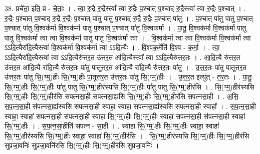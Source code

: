\documentclass[17pt]{extarticle}
\begin{document}
38. प्रचे॑ता॒ इति॒ प्र - चे॒ताः॒ । . त्वा॒ रु॒द्रै रु॒द्रैस्त्वा᳚ त्वा रु॒द्रैः प॒श्चात् प॒श्चाद् रु॒द्रैस्त्वा᳚ त्वा रु॒द्रैः प॒श्चात् । . रु॒द्रैः प॒श्चात् प॒श्चाद् रु॒द्रै रु॒द्रैः प॒श्चात् पा॑तु पातु प॒श्चाद् रु॒द्रै रु॒द्रैः प॒श्चात् पा॑तु । . प॒श्चात् पा॑तु पातु प॒श्चात् प॒श्चात् पा॑तु वि॒श्वक॑र्मा वि॒श्वक॑र्मा पातु प॒श्चात् प॒श्चात् पा॑तु वि॒श्वक॑र्मा । . पा॒तु॒ वि॒श्वक॑र्मा वि॒श्वक॑र्मा पातु पातु वि॒श्वक॑र्मा त्वा त्वा वि॒श्वक॑र्मा पातु पातु वि॒श्वक॑र्मा त्वा । . वि॒श्वक॑र्मा त्वा त्वा वि॒श्वक॑र्मा वि॒श्वक॑र्मा त्वा ऽऽदि॒त्यैरा॑दि॒त्यैस्त्वा॑ वि॒श्वक॑र्मा वि॒श्वक॑र्मा त्वा ऽऽदि॒त्यैः । . वि॒श्वक॒र्मेति॑ वि॒श्व - क॒र्मा॒ । . त्वा॒ ऽऽदि॒त्यैरा॑दि॒त्यैस्त्वा᳚ त्वा ऽऽदि॒त्यैरु॑त्तर॒त उ॑त्तर॒त आ॑दि॒त्यैस्त्वा᳚ त्वा ऽऽदि॒त्यैरु॑त्तर॒तः । . आ॒दि॒त्यै रु॑त्तर॒त उ॑त्तर॒त आ॑दि॒त्यै रा॑दि॒त्यै रु॑त्तर॒तः पा॑तु पातूत्तर॒त आ॑दि॒त्यै रा॑दि॒त्यै रु॑त्तर॒तः पा॑तु । . उ॒त्त॒र॒तः पा॑तु पातूत्तर॒त उ॑त्तर॒तः पा॑तु सि॒(ग्म्॒)हीः सि॒(ग्म्॒)हीः पा॒तूत्तर॒त उ॑त्तर॒तः पा॑तु सि॒(ग्म्॒)हीः । . उ॒त्त॒र॒त इत्यु॑त् - त॒र॒तः । . पा॒तु॒ सि॒(ग्म्॒)हीः सि॒(ग्म्॒)हीः पा॑तु पातु सि॒(ग्म्॒)हीर॑स्यसि सि॒(ग्म्॒)हीः पा॑तु पातु सि॒(ग्म्॒)हीर॑सि । . सि॒(ग्म्॒)हीर॑स्यसि सि॒(ग्म्॒)हीः सि॒(ग्म्॒)हीर॑सि सपत्नसा॒ही स॑पत्नसा॒ह्य॑सि सि॒(ग्म्॒)हीः सि॒(ग्म्॒)हीर॑सि सपत्नसा॒ही । . अ॒सि॒ स॒प॒त्न॒सा॒ही स॑पत्नसा॒ह्य॑स्यसि सपत्नसा॒ही स्वाहा॒ स्वाहा॑ सपत्नसा॒ह्य॑स्यसि सपत्नसा॒ही स्वाहा᳚ । . स॒प॒त्न॒सा॒ही स्वाहा॒ स्वाहा॑ सपत्नसा॒ही स॑पत्नसा॒ही स्वाहा॑ सि॒(ग्म्॒)हीः सि॒(ग्म्॒)हीः स्वाहा॑ सपत्नसा॒ही स॑पत्नसा॒ही स्वाहा॑ सि॒(ग्म्॒)हीः । . स॒प॒त्न॒सा॒हीति॑ सपत्न - सा॒ही । . स्वाहा॑ सि॒(ग्म्॒)हीः सि॒(ग्म्॒)हीः स्वाहा॒ स्वाहा॑ सि॒(ग्म्॒)हीर॑स्यसि सि॒(ग्म्॒)हीः स्वाहा॒ स्वाहा॑ सि॒(ग्म्॒)हीर॑सि । . सि॒(ग्म्॒)हीर॑स्यसि सि॒(ग्म्॒)हीः सि॒(ग्म्॒)हीर॑सि सुप्रजा॒वनिः॑ सुप्रजा॒वनि॑रसि सि॒(ग्म्॒)हीः सि॒(ग्म्॒)हीर॑सि सुप्रजा॒वनिः॑ । \newline
\end{document}
